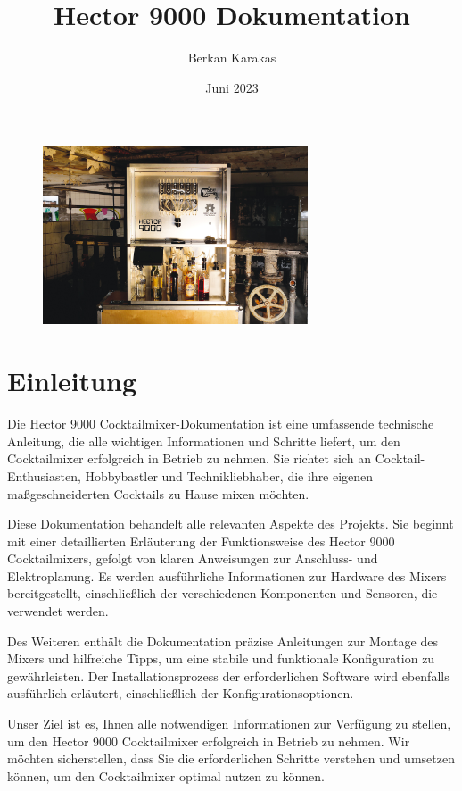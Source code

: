 \documentclass[12pt,letterpaper]{article}
\title{Hector 9000 Dokumentation}
\author{Berkan Karakas}
\date{Juni 2023}
\begin{document}
	\maketitle
	
	\begin{figure}[h]
		\centering
		\includegraphics[width=0.7\textwidth]{hector9000.jpg}
	\end{figure}
	
	\newpage
	
	\tableofcontents
	
	\newpage
	
	\section{Einleitung}
		Die Hector 9000 Cocktailmixer-Dokumentation ist eine umfassende technische Anleitung, die alle wichtigen Informationen und Schritte liefert, um den Cocktailmixer erfolgreich in Betrieb zu nehmen. Sie richtet sich an Cocktail-Enthusiasten, Hobbybastler und Technikliebhaber, die ihre eigenen maßgeschneiderten Cocktails zu Hause mixen möchten.
		
		Diese Dokumentation behandelt alle relevanten Aspekte des Projekts. Sie beginnt mit einer detaillierten Erläuterung der Funktionsweise des Hector 9000 Cocktailmixers, gefolgt von klaren Anweisungen zur Anschluss- und Elektroplanung. Es werden ausführliche Informationen zur Hardware des Mixers bereitgestellt, einschließlich der verschiedenen Komponenten und Sensoren, die verwendet werden.
		
		Des Weiteren enthält die Dokumentation präzise Anleitungen zur Montage des Mixers und hilfreiche Tipps, um eine stabile und funktionale Konfiguration zu gewährleisten. Der Installationsprozess der erforderlichen Software wird ebenfalls ausführlich erläutert, einschließlich der Konfigurationsoptionen.
		
		Unser Ziel ist es, Ihnen alle notwendigen Informationen zur Verfügung zu stellen, um den Hector 9000 Cocktailmixer erfolgreich in Betrieb zu nehmen. Wir möchten sicherstellen, dass Sie die erforderlichen Schritte verstehen und umsetzen können, um den Cocktailmixer optimal nutzen zu können.
		
\end{document}

